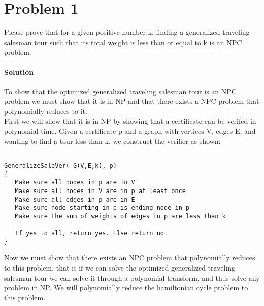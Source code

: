 \documentclass[12pt]{article}
\begin{document}
\maketitle


\section{Problem 1}
Please prove that for a given positive number k, finding a generalized traveling salesman tour such that its total weight is less than or equal to k is an NPC problem.

\paragraph{Solution}
To show that the optimized generalized traveling salesman tour is an NPC problem we must show that it is in NP and that there exists a NPC problem that polynomially reduces to it.\\
First we will show that it is in NP by showing that a certificate can be verifed in polynomial time.  Given a certificate p and a graph with vertices V, edges E, and wanting to find a tour less than k, we construct the verifier as shown:

\begin{lstlisting}

GeneralizeSaleVer( G(V,E,k), p)
{
   Make sure all nodes in p are in V
   Make sure all nodes in V are in p at least once
   Make sure all edges in p are in E
   Make sure node starting in p is ending node in p
   Make sure the sum of weights of edges in p are less than k
   
   If yes to all, return yes. Else return no.
}

\end{lstlisting}

Now we must show that there exists an NPC problem that polynomially reduces to this problem, that is if we can solve the optimized generalized traveling salesman tour we can solve it through a polynomial transform, and thus solve any problem in NP.  We will polynomially reduce the hamiltonian cycle problem to this problem.  \\
\end{document}
